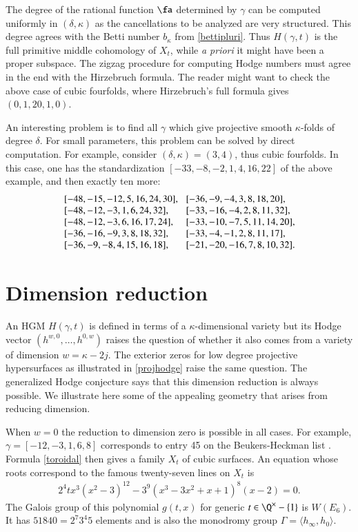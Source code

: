 \documentclass{notices}
\numberwithin{equation}{section}
\numberwithin{table}{section}
\numberwithin{figure}{section}
\begin{document}
{The degree of the rational function $\fa$ determined by $\gamma$ can be computed 
uniformly in $(\delta,\kappa)$ as the cancellations to be analyzed 
are very structured.  This degree agrees with the Betti 
number $b_\kappa$ from \eqref{bettipluri}.   Thus
$H(\gamma,t)$ is the full primitive middle cohomology
of $X_t$, while {\em a priori} it might have been a proper
subspace.   The zigzag procedure for computing 
Hodge numbers must agree in the end with the Hirzebruch
formula.  The reader might want to check the above case of 
cubic fourfolds, where Hirzebruch's full formula gives $(0,1,20,1,0)$. 


  An interesting
problem is to find all $\gamma$ which give projective smooth
$\kappa$-folds of degree $\delta$.  For small parameters, this
problem can be solved by direct computation.  For example,
consider $(\delta,\kappa)=(3,4)$, thus cubic fourfolds.  
In this case, one has the standardization $[-33,-8,-2,1,4,16,22]$ of
the above example, and then exactly ten more:  
\[
{\renewcommand{\arraycolsep}{0pt}
{
\!\! \begin{array}{ll}
\, [-48, -15, -12, 5, 16, 24, 30], \; \; \; & [-36, -9, -4, 3, 8, 18, 20],\\
\, [-48, -12, -3, 1, 6, 24, 32], & [-33, -16, -4, 2, 8, 11,32],\\
\, [-48,-12, -3, 6, 16, 17, 24], & [-33, -10, -7, 5, 11, 14, 20],\\
\, [-36, -16, -9, 3, 8, 18, 32], & [-33,-4, -1, 2, 8, 11, 17], \\
 \,[-36, -9, -8,4, 15, 16, 18], &  [-21, -20, -16, 7, 8, 10, 32].
 \end{array}
\!\! }
}
\]

\section{Dimension reduction}
\label{dimension}
    An HGM $H(\gamma,t)$ is defined in terms of a $\kappa$-dimensional variety
but its Hodge vector $(h^{w,0},\dots,h^{0,w})$ raises the question  
of whether it also comes from a variety of dimension $w = \kappa-2j$.  
The exterior zeros for low degree projective hypersurfaces  
as illustrated in \eqref{projhodge} raise the same question.  The
generalized Hodge conjecture says that this dimension 
reduction is always possible.  We illustrate here some 
of the appealing geometry that arises from 
reducing dimension.

 When $w=0$ the reduction 
to dimension zero is possible in all cases.  For example, 
$\gamma = [-12,-3,1,6,8]$ corresponds to entry 45
on the Beukers-Heckman list \cite[Table~8.3]{BH}.
Formula \eqref{toroidal} then gives a family $X_t$ of cubic surfaces.
An equation whose roots correspond to the famous twenty-seven lines
on $X_t$ is 
\begin{align}
\label{xt}
2^4tx^3(x^2-3)^{12} - 3^9(x^3-3 x^2+x+1)^8(x-2) = 0.
\end{align}
The Galois group of this polynomial $g(t,x)$ 
for generic $t \in \Q^\times  - \{1\}$ 
is $W(E_6)$.  It has 
$51840 = 2^7 3^4 5$ elements and is also the monodromy group $\Gamma = \langle h_\infty,h_0 \rangle$.  


}
\end{document}
